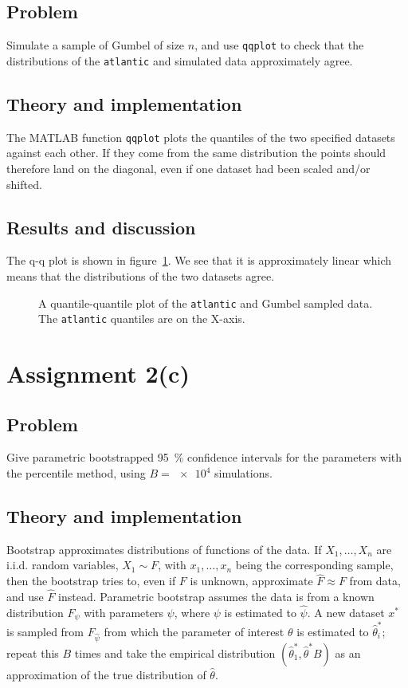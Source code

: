 \documentclass[11pt, a4paper]{article}
\begin{document}
\subsection{Problem}
Simulate a sample of Gumbel of size $n$,
and use \texttt{qqplot} to check that the distributions of the \texttt{atlantic} and simulated data
approximately agree.
\subsection{Theory and implementation}
The MATLAB function \texttt{qqplot} plots the quantiles of the two specified datasets
against each other.
If they come from the same distribution the points should therefore land on the diagonal,
even if one dataset had been scaled and/or shifted.
\subsection{Results and discussion}
The q-q plot is shown in figure~\ref{fig:qqplot}.
We see that it is approximately linear which means that the distributions
of the two datasets agree.

\begin{figure}
	\centering
	
	\caption{A quantile-quantile plot of the \texttt{atlantic} and Gumbel sampled data.
	The \texttt{atlantic} quantiles are on the X-axis. \label{fig:qqplot}}
\end{figure}

\section{Assignment 2(c)}\label{sec:atlantic_param_bootstrap}
\subsection{Problem}
Give parametric bootstrapped \SI{95}{\percent} confidence intervals for the parameters
with the percentile method, using $B = \num{e4}$ simulations.
\subsection{Theory and implementation}
Bootstrap approximates distributions of functions of the data.
If $X_1, \ldots, X_n$ are i.i.d. random variables, $X_1 \sim F$,
with $x_1, \ldots, x_n$ being the corresponding sample,
then the bootstrap tries to, even if $F$ is unknown, approximate $\hat F \approx F$ from data,
and use $\hat F$ instead.
Parametric bootstrap assumes the data is from a known distribution $F_\psi$
with parameters $\psi$, where $\psi$ is estimated to $\hat\psi$.
A new dataset $x^*$ is sampled from $F_{\hat\psi}$
from which the parameter of interest $\theta$ is estimated to $\hat\theta^*_i$;
repeat this $B$ times and take the empirical distribution $(\hat\theta^*_1, \hat\theta^*B)$
as an approximation of the true distribution of $\hat\theta$.
\end{document}
